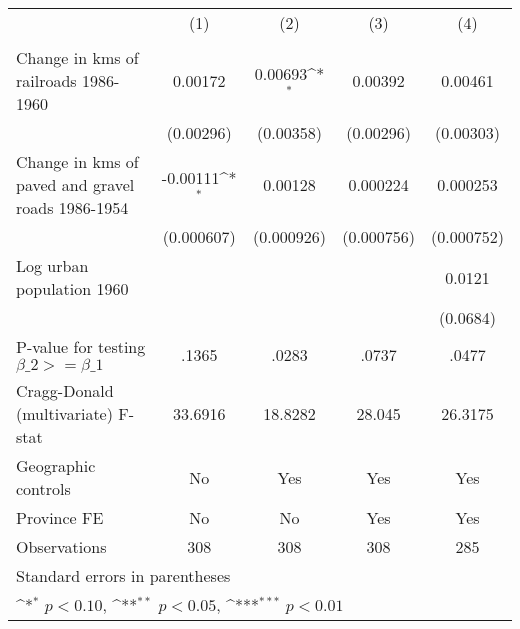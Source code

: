 {
\def\sym#1{\ifmmode^{#1}\else\(^{#1}\)\fi}
\begin{tabular}{l*{4}{c}}
\hline\hline
                &\multicolumn{1}{c}{(1)}&\multicolumn{1}{c}{(2)}&\multicolumn{1}{c}{(3)}&\multicolumn{1}{c}{(4)}\\
                &\multicolumn{1}{c}{}&\multicolumn{1}{c}{}&\multicolumn{1}{c}{}&\multicolumn{1}{c}{}\\
\hline
Change in kms of railroads 1986-1960&  0.00172         &  0.00693\sym{*}  &  0.00392         &  0.00461         \\
                &(0.00296)         &(0.00358)         &(0.00296)         &(0.00303)         \\
[1em]
Change in kms of paved and gravel roads 1986-1954& -0.00111\sym{*}  &  0.00128         & 0.000224         & 0.000253         \\
                &(0.000607)         &(0.000926)         &(0.000756)         &(0.000752)         \\
[1em]
Log urban population 1960&                  &                  &                  &   0.0121         \\
                &                  &                  &                  & (0.0684)         \\
\hline
P-value for testing $\beta\_{2} >= \beta\_{1}$&    .1365         &    .0283         &    .0737         &    .0477         \\
Cragg-Donald (multivariate) F-stat&  33.6916         &  18.8282         &   28.045         &  26.3175         \\
Geographic controls&       No         &      Yes         &      Yes         &      Yes         \\
Province FE     &       No         &       No         &      Yes         &      Yes         \\
Observations    &      308         &      308         &      308         &      285         \\
\hline\hline
\multicolumn{5}{l}{\footnotesize Standard errors in parentheses}\\
\multicolumn{5}{l}{\footnotesize \sym{*} \(p<0.10\), \sym{**} \(p<0.05\), \sym{***} \(p<0.01\)}\\
\end{tabular}
}
